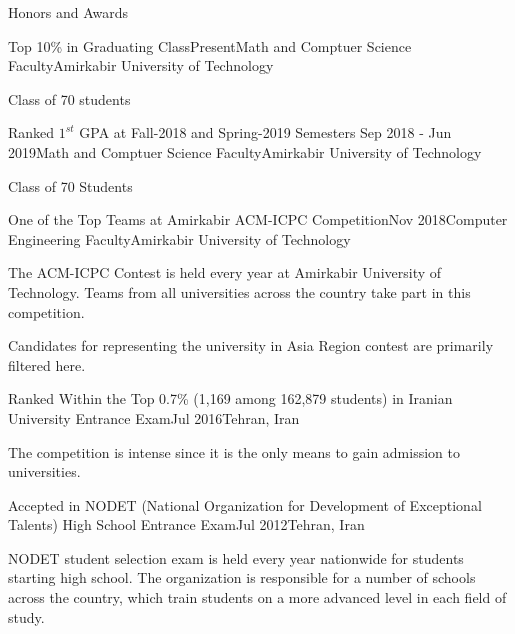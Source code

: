 \documentclass{resume} %
\begin{document}
	\begin{rSection}{Honors and Awards}
		\begin{rSubsection}{Top 10\% in Graduating Class}{Present}{Math and Comptuer Science Faculty}{Amirkabir University of Technology}
			\item Class of 70 students
		\end{rSubsection}
		
		\begin{rSubsection}{Ranked $1^{st}$ GPA at Fall-2018 and Spring-2019 Semesters }{Sep 2018 - Jun 2019}{Math and Comptuer Science Faculty}{Amirkabir University of Technology}
			\item Class of 70 Students
		\end{rSubsection}	
		
		\begin{rSubsection}{One of the Top Teams at Amirkabir ACM-ICPC Competition}{Nov 2018}{Computer Engineering Faculty}{Amirkabir University of Technology}
			\item The ACM-ICPC Contest is held every year at Amirkabir University of Technology. Teams from all universities across the country take part in this competition.
			\item Candidates for representing the university in Asia Region contest are primarily filtered here.
		\end{rSubsection}
		
		\begin{rSubsection}{Ranked Within the Top 0.7\% (1,169 among 162,879 students) in Iranian University Entrance Exam}{Jul 2016}{Tehran, Iran }{ }
			\item The competition is intense since it is the only means to gain admission to universities.
		\end{rSubsection} 
		
		\begin{rSubsection}{Accepted in NODET (National Organization for Development of Exceptional Talents) High School Entrance Exam}{Jul 2012}{Tehran, Iran }{ }
			\item NODET student selection exam is held every year nationwide for students starting high school. The organization is responsible for a number of schools across the country, which train students on a more advanced level in each field of study.
		\end{rSubsection}
		
	\end{rSection}
\end{document}

